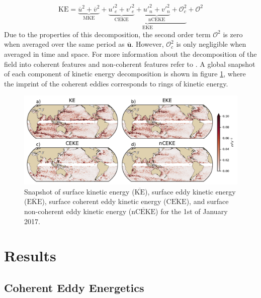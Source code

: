 \documentclass[draft,linenumbers]{agujournal2019}
\newcommand{\MKE}{\overline{\textrm{KE}}}
\newcommand{\mKE}{\textrm{MKE}}
\newcommand{\MEKE}{\overline{\textrm{EKE}}}
\newcommand{\EKE}{\textrm{EKE}}
\newcommand{\MCEKE}{\overline{\textrm{CEKE}}}
\newcommand{\CEKE}{\textrm{CEKE}}
\newcommand{\MnCEKE}{\overline{\textrm{nCEKE}}}
\newcommand{\nCEKE}{\textrm{nCEKE}}
\begin{document}
	\begin{equation}
		\mathrm{KE} = \underbrace{\overline{u}^2 + \overline{v}^2}_{\mKE} + 
		\underbrace{\underbrace{{u'}_e^2+{v'}_e^2}_{\CEKE}  + \underbrace{{u'}_n^2+{v'}_n^2}_{\nCEKE} + \mathcal{O}_c^2 }_{\EKE} + \mathcal{O}^2
	\end{equation}
	Due to the properties of this decomposition, the second order term $\mathcal{O}^2$ is zero when averaged over the same period as $\mathbf{\overline{u}}$. However, $\mathcal{O}_c^2$ is only negligible when averaged in time and space. For more information about the decomposition of the field into coherent features and non-coherent features refer to \citet{Martinez_Kinetic_2019}. A global snapshot of each component of kinetic energy decomposition is shown in figure \ref{fig:eddy_snapshot}, where the imprint of the coherent eddies corresponds to rings of kinetic energy.

	\begin{figure}
	    \centering
	    \includegraphics[width=1\textwidth]{figures/snapshot_ke_maps_satellite.pdf}
	    \caption{Snapshot of surface kinetic energy ($\MKE$), surface eddy kinetic energy ($\MEKE$), surface coherent eddy kinetic energy ($\MCEKE$), and surface non-coherent eddy kinetic energy ($\MnCEKE$) for the 1st of January 2017.}
	    \label{fig:eddy_snapshot}
	\end{figure}



	\section{Results}
	\label{sec:Results}
	
	\subsection{Coherent Eddy Energetics}
	\label{subsec:CEKE_climatology}
\end{document}
